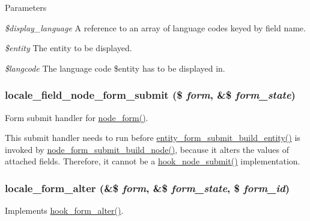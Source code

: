 \begin{DoxyParams}{Parameters}
\item[{\em \$display\_\-language}]A reference to an array of language codes keyed by field name. \item[{\em \$entity}]The entity to be displayed. \item[{\em \$langcode}]The language code \$entity has to be displayed in. \end{DoxyParams}
\hypertarget{locale_8module_a178a47bb849c82c0e9224956f0d3f7f3}{
\subsubsection[{locale\_\-field\_\-node\_\-form\_\-submit}]{\setlength{\rightskip}{0pt plus 5cm}locale\_\-field\_\-node\_\-form\_\-submit (\$ {\em form}, \/  \&\$ {\em form\_\-state})}}
\label{locale_8module_a178a47bb849c82c0e9224956f0d3f7f3}
Form submit handler for \hyperlink{group__forms_ga267299500e205db099ee4e8396769d3f}{node\_\-form()}.

This submit handler needs to run before \hyperlink{common_8inc_a0aac8c55307d5f8bca09e44481bcfc9a}{entity\_\-form\_\-submit\_\-build\_\-entity()} is invoked by \hyperlink{node_8pages_8inc_a09cc7aec34e871fc093e18e18b8f4889}{node\_\-form\_\-submit\_\-build\_\-node()}, because it alters the values of attached fields. Therefore, it cannot be a \hyperlink{group__node__api__hooks_ga1b479b731ecb3f9eec0c92e3e1a8e01d}{hook\_\-node\_\-submit()} implementation. \hypertarget{locale_8module_a06e23e3ad26b4c81e48ecc15f538dd81}{
\subsubsection[{locale\_\-form\_\-alter}]{\setlength{\rightskip}{0pt plus 5cm}locale\_\-form\_\-alter (\&\$ {\em form}, \/  \&\$ {\em form\_\-state}, \/  \$ {\em form\_\-id})}}
\label{locale_8module_a06e23e3ad26b4c81e48ecc15f538dd81}
Implements \hyperlink{group__hooks_ga6df3cea27ae1407aeef4eae5444cb213}{hook\_\-form\_\-alter()}.

